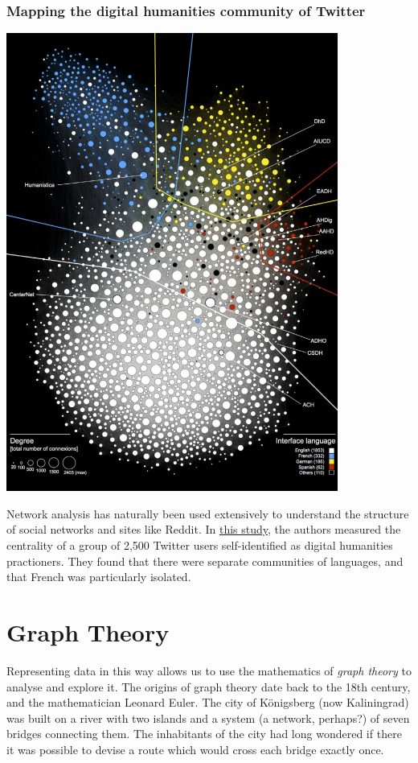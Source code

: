\documentclass[
]{book}
\begin{document}
\hypertarget{mapping-the-digital-humanities-community-of-twitter}{%
\subsubsection{Mapping the digital humanities community of Twitter}\label{mapping-the-digital-humanities-community-of-twitter}}

\includegraphics{images/Screenshot 2022-10-03 at 11.46.29.png}

Network analysis has naturally been used extensively to understand the structure of social networks and sites like Reddit. In \href{https://halshs.archives-ouvertes.fr/hal-01517493}{this study}, the authors measured the centrality of a group of 2,500 Twitter users self-identified as digital humanities practioners. They found that there were separate communities of languages, and that French was particularly isolated.

\hypertarget{graph-theory}{%
\section{Graph Theory}\label{graph-theory}}

Representing data in this way allows us to use the mathematics of \emph{graph theory} to analyse and explore it. The origins of graph theory date back to the 18th century, and the mathematician Leonard Euler. The city of Königsberg (now Kaliningrad) was built on a river with two islands and a system (a network, perhaps?) of seven bridges connecting them. The inhabitants of the city had long wondered if there it was possible to devise a route which would cross each bridge exactly once.
\end{document}
